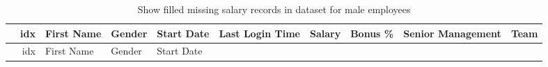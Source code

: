 \documentclass [oneside,10pt,a4paper,ngerman,BCOR10mm,headsepline,parindent,final]{scrartcl}
\begin{document}
    \begin{longtable}[]{@{}rrllllrrll@{}}
\caption{Show filled missing salary records in dataset for male
employees}\tabularnewline
\toprule
\begin{minipage}[b]{0.02\columnwidth}\raggedleft
\strut
\end{minipage} & \begin{minipage}[b]{0.04\columnwidth}\raggedleft
idx\strut
\end{minipage} & \begin{minipage}[b]{0.08\columnwidth}\raggedright
First Name\strut
\end{minipage} & \begin{minipage}[b]{0.06\columnwidth}\raggedright
Gender\strut
\end{minipage} & \begin{minipage}[b]{0.08\columnwidth}\raggedright
Start Date\strut
\end{minipage} & \begin{minipage}[b]{0.11\columnwidth}\raggedright
Last Login Time\strut
\end{minipage} & \begin{minipage}[b]{0.06\columnwidth}\raggedleft
Salary\strut
\end{minipage} & \begin{minipage}[b]{0.06\columnwidth}\raggedleft
Bonus \%\strut
\end{minipage} & \begin{minipage}[b]{0.12\columnwidth}\raggedright
Senior Management\strut
\end{minipage} & \begin{minipage}[b]{0.10\columnwidth}\raggedright
Team\strut
\end{minipage}\tabularnewline
\midrule
\endfirsthead
\toprule
\begin{minipage}[b]{0.02\columnwidth}\raggedleft
\strut
\end{minipage} & \begin{minipage}[b]{0.04\columnwidth}\raggedleft
idx\strut
\end{minipage} & \begin{minipage}[b]{0.08\columnwidth}\raggedright
First Name\strut
\end{minipage} & \begin{minipage}[b]{0.06\columnwidth}\raggedright
Gender\strut
\end{minipage} & \begin{minipage}[b]{0.08\columnwidth}\raggedright
Start Date\strut
\end{minipage} & \begin{minipage}[b]{0.11\columnwidth}\raggedright

\end{minipage}
\end{longtable}
\end{document}
